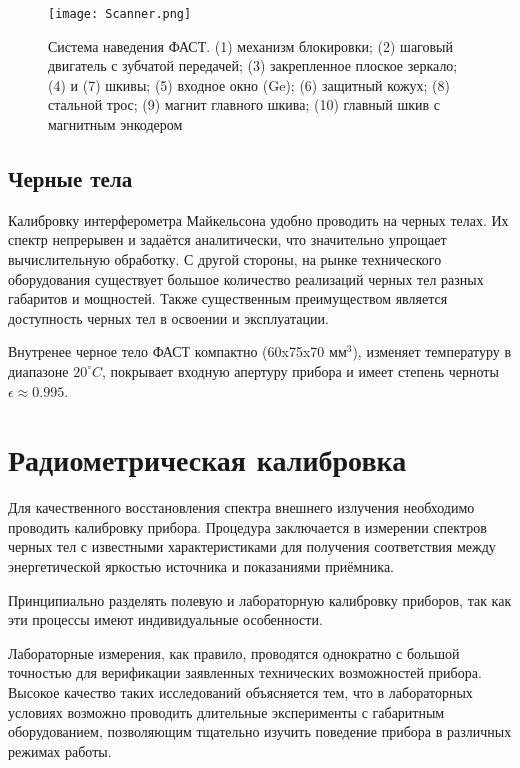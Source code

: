 \documentclass{mipt-thesis-bs}
\begin{document}
	\begin{figure}[h]
		\centering
		\texttt{[image: Scanner.png]}
		\caption{Система наведения ФАСТ. (1) механизм блокировки; (2) шаговый двигатель с зубчатой передачей; (3) закрепленное плоское
			зеркало; (4) и (7) шкивы; (5) входное окно (Ge); (6) защитный кожух; (8) стальной трос; (9) магнит главного шкива; (10) главный шкив с магнитным энкодером}
		\label{Scanner}
	\end{figure} 
	 
	
	\section{Черные тела}
	
	Калибровку интерферометра Майкельсона удобно проводить на черных телах. Их спектр непрерывен и задаётся аналитически, что значительно упрощает вычислительную обработку. С другой стороны, на рынке технического оборудования существует большое количество реализаций черных тел разных габаритов и мощностей. Также существенным преимуществом является доступность черных тел в освоении и эксплуатации. 
	
	Внутренее черное тело ФАСТ компактно (60x75x70 $мм^3$), изменяет температуру в диапазоне $20^\circ C$, покрывает входную апертуру прибора и имеет степень черноты $\epsilon \approx 0.995$.  \cite{shakun2019compact,} 




		
	\chapter{Радиометрическая калибровка}
	
	Для качественного восстановления спектра внешнего излучения необходимо проводить калибровку прибора.  Процедура заключается в измерении спектров черных тел с известными характеристиками для получения соответствия между энергетической яркостью источника и показаниями приёмника. 

Принципиально разделять полевую и лабораторную калибровку приборов, так как эти процессы имеют индивидуальные особенности. 

Лабораторные измерения, как правило, проводятся однократно с большой точностью для верификации заявленных технических возможностей прибора. Высокое качество таких исследований объясняется тем, что в лабораторных условиях возможно проводить длительные эксперименты с габаритным оборудованием, позволяющим тщательно изучить поведение прибора в различных режимах работы. 
 
\end{document}
